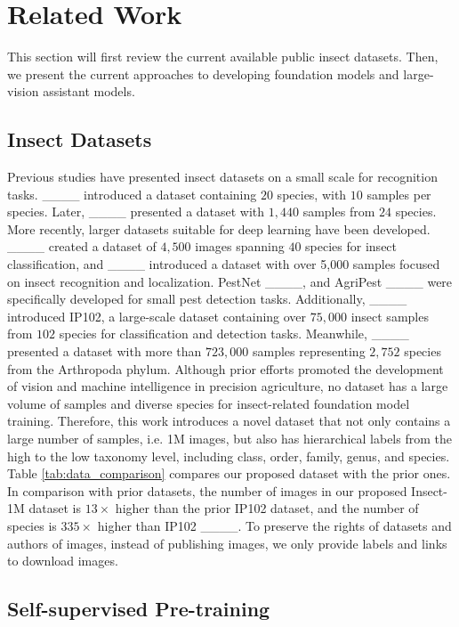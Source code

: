 \section{Related Work}
This section will first review the current available public insect datasets. Then, we present the current approaches to developing foundation models and large-vision assistant models.

\subsection{Insect Datasets}

Previous studies have presented insect datasets on a small scale for recognition tasks.
____ introduced a dataset containing $20$ species, with $10$ samples per species.
Later, ____ presented a dataset with $1,440$ samples from $24$ species. 
More recently, larger datasets suitable for deep learning have been developed. ____ created a dataset of $4,500$ images spanning $40$ species for insect classification, and ____ introduced a dataset with over 5,000 samples focused on insect recognition and localization. 
PestNet ____, and AgriPest ____ were specifically developed for small pest detection tasks.
Additionally, ____ introduced IP102, a large-scale dataset containing over $75,000$ insect samples from $102$ species for classification and detection tasks. 
Meanwhile, ____ presented a dataset with more than $723,000$ samples representing $2,752$ species from the Arthropoda phylum.
Although prior efforts promoted the development of vision and machine intelligence in precision agriculture, no dataset has a large volume of samples and diverse species for insect-related foundation model training. 
Therefore, this work introduces a novel dataset that not only contains a large number of samples, i.e. 1M images, but also has hierarchical labels from the high to the low taxonomy level, including class, order, family, genus, and species.
Table \ref{tab:data_comparison}  compares our proposed dataset with the prior ones.
In comparison with prior datasets, the number of images in our proposed Insect-1M dataset is $13\times$ higher than the prior IP102 dataset, and the number of species is $335\times$ higher than IP102 ____.
To preserve the rights of datasets and authors of images, instead of publishing images, we only provide labels and links to download images.

\subsection{Self-supervised Pre-training}

